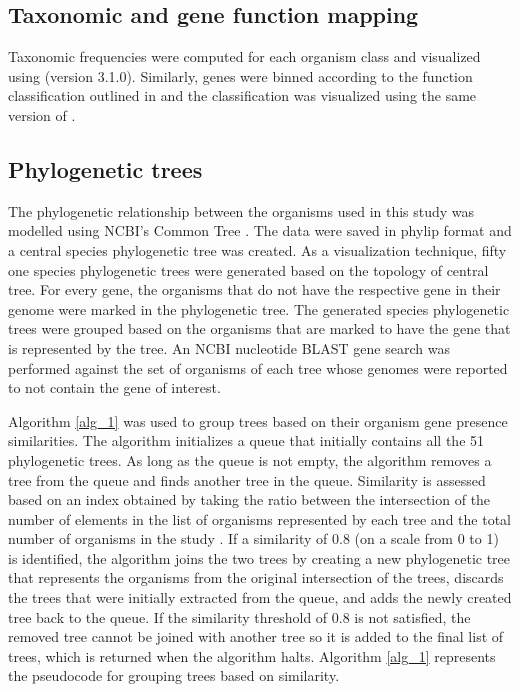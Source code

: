 \documentclass{article}
\begin{document}
\subsection{Taxonomic and gene function mapping}
Taxonomic frequencies were computed for each organism class and visualized using \cite{matplotlib} (version 3.1.0). Similarly, genes were binned according to the function classification outlined in \cite{pg_chapter} and the classification was visualized using the same version of \cite{matplotlib}.

\subsection{Phylogenetic trees}
The phylogenetic relationship between the organisms used in this study was modelled using NCBI's Common Tree \cite{ncbi_tax_1, ncbi_tax_2}. The data were saved in phylip format and a central species phylogenetic tree was created. As a visualization technique, fifty one species phylogenetic trees were generated based on the topology of central tree. For every gene, the organisms that do not have the respective gene in their genome were marked in the phylogenetic tree. The generated species phylogenetic trees were grouped based on the organisms that are marked to have the gene that is represented by the tree. An NCBI nucleotide BLAST gene search was performed against the set of organisms of each tree whose genomes were reported to not contain the gene of interest.

Algorithm \ref{alg_1} was used to group trees based on their organism gene presence similarities. The algorithm initializes a queue that initially contains all the 51 phylogenetic trees. As long as the queue is not empty, the algorithm removes a tree from the queue and finds another tree in the queue. Similarity is assessed based on an index obtained by taking the ratio between the intersection of the number of elements in the list of organisms represented by each tree and the total number of organisms in the study \cite{jaccard}. If a similarity of 0.8 (on a scale from 0 to 1) is identified, the algorithm joins the two trees by creating a new phylogenetic tree that represents the organisms from the original intersection of the trees, discards the trees that were initially extracted from the queue, and adds the newly created tree back to the queue. If the similarity threshold of 0.8 is not satisfied, the removed tree cannot be joined with another tree so it is added to the final list of trees, which is returned when the algorithm halts. Algorithm \ref{alg_1} represents the pseudocode for grouping trees based on similarity.
\end{document}
